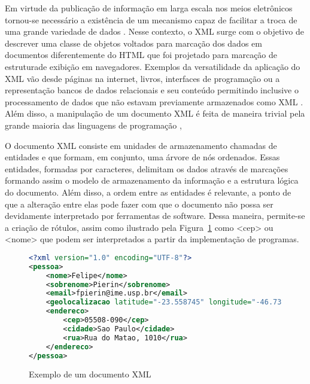 
Em virtude da publicação de informação em larga escala nos meios eletrônicos tornou-se necessário a existência de um mecanismo capaz de facilitar a troca de uma grande variedade de dados \citep{W3C_XML}. Nesse contexto, o XML surge com o objetivo de descrever uma classe de objetos voltados para marcação dos dados em documentos diferentemente do HTML que foi projetado para marcação de estruturade exibição em navegadores. Exemplos da versatilidade da aplicação do XML vão desde páginas na internet, livros, interfaces de programação ou a representação bancos de dados relacionais e seu conteúdo permitindo inclusive o processamento de dados que não estavam previamente armazenados como XML \citep{Wang}. Além disso, a manipulação de um documento XML é feita de maneira trivial pela grande maioria das linguagens de programação \citep{Heath2008},
 
O documento XML consiste em unidades de armazenamento chamadas de entidades e que formam, em conjunto, uma árvore de nós ordenados. Essas entidades, formadas por caracteres, delimitam os dados através de marcações formando assim o modelo de armazenamento da informação e a estrutura lógica do documento. Além disso, a ordem entre as entidades é relevante, a ponto de que a alteração entre elas pode fazer com que o documento não possa ser devidamente interpretado por ferramentas de software. Dessa maneira, permite-se a criação de rótulos, assim como ilustrado pela Figura~\ref{fig:exemplo_codigo_xml} como <cep> ou <nome> que podem ser interpretados a partir da implementação de programas. 

\begin{figure}[!ht]
    \begin{lstlisting}[language=XML]
<?xml version="1.0" encoding="UTF-8"?>
<pessoa>
	<nome>Felipe</nome>
	<sobrenome>Pierin</sobrenome>
	<email>fpierin@ime.usp.br</email>
	<geolocalizacao latitude="-23.558745" longitude="-46.731859" />
	<endereco>
		<cep>05508-090</cep>
		<cidade>Sao Paulo</cidade>
	    <rua>Rua do Matao, 1010</rua>
	</endereco>
</pessoa>	
    \end{lstlisting}
    \caption{Exemplo de um documento XML}
    \label{fig:exemplo_codigo_xml} 
\end{figure}

